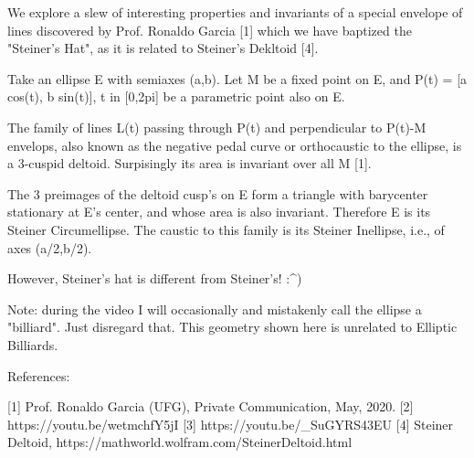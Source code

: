 We explore a slew of interesting properties and invariants of a special envelope of lines discovered by Prof. Ronaldo Garcia [1] which we have baptized the "Steiner's Hat", as it is related to Steiner's Dekltoid [4].

Take an ellipse E with semiaxes (a,b). Let M be a fixed point on E, and P(t) = [a cos(t), b sin(t)], t in [0,2pi] be a parametric point also on E.

The family of lines L(t) passing through P(t) and perpendicular to P(t)-M envelops, also known as the negative pedal curve or orthocaustic to the ellipse, is a 3-cuspid deltoid. Surpisingly its area is invariant over all M [1].

The 3 preimages of the deltoid cusp's on E form a triangle with barycenter stationary at E's center, and whose area is also invariant. Therefore E is its Steiner Circumellipse. The caustic to this family is its Steiner Inellipse, i.e., of axes (a/2,b/2).

However, Steiner's hat is different from Steiner's! :^)

Note: during the video I will occasionally and mistakenly call the ellipse a "billiard". Just disregard that. This geometry shown here is unrelated to Elliptic Billiards.

References:

[1] Prof. Ronaldo Garcia (UFG), Private Communication, May, 2020.
[2] https://youtu.be/wetmchfY5jI
[3] https://youtu.be/_SuGYRS43EU
[4] Steiner Deltoid, https://mathworld.wolfram.com/SteinerDeltoid.html